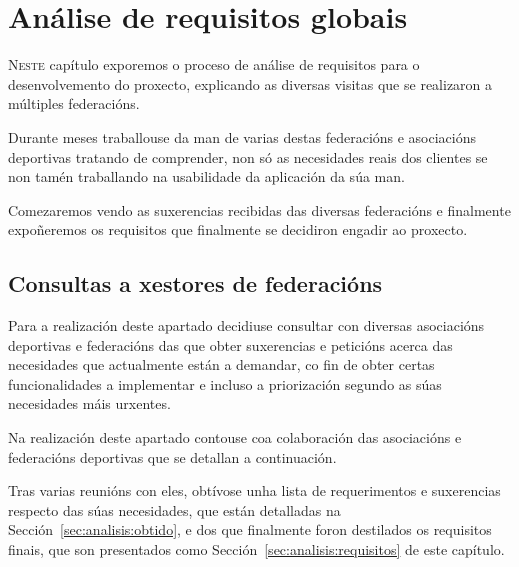 \chapter{Análise de requisitos globais}
\minitoc


  \lettrine{N}{este} capítulo exporemos o proceso de análise de requisitos 
para o desenvolvemento do proxecto, explicando as diversas visitas que se 
realizaron a múltiples federacións.

  Durante meses traballouse da man de varias destas federacións e asociacións 
deportivas tratando de comprender, non só as necesidades reais dos clientes se 
non tamén traballando na usabilidade da aplicación da súa man.

  Comezaremos vendo as suxerencias recibidas das diversas federacións e 
finalmente expoñeremos os requisitos que finalmente se decidiron engadir ao 
proxecto.

  \section{Consultas a xestores de federacións}
  Para a realización deste apartado decidiuse consultar con diversas 
asociacións deportivas e federacións das que obter suxerencias e peticións 
acerca das necesidades que actualmente están a demandar, co fin de obter certas 
funcionalidades a implementar e incluso a priorización segundo as súas
necesidades máis urxentes.

Na realización deste apartado contouse coa colaboración das asociacións e 
federacións deportivas que se detallan a continuación.

  Tras varias reunións con eles, obtívose unha lista de requerimentos e 
suxerencias respecto das súas necesidades, que están detalladas 
na Sección~\ref{sec:analisis:obtido}, e dos que finalmente foron destilados os 
requisitos finais, que son presentados como 
Sección~\ref{sec:analisis:requisitos} de este capítulo.

